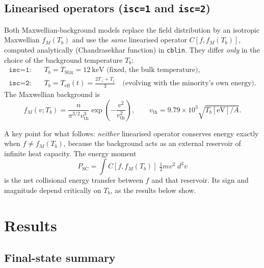 \documentclass[11pt,a4paper]{article}
\begin{document}
\subsection{Linearised operators (\texttt{isc=1} and \texttt{isc=2})}

Both Maxwellian-background models replace the field distribution by an
isotropic Maxwellian $f_M(T_b)$ and use the \emph{same} linearised operator
$C[f, f_M(T_b)]$, computed analytically (Chandrasekhar function) in
\texttt{cblin}. They differ \emph{only} in the choice of the background
temperature $T_b$:
\begin{align}
  \texttt{isc=1}:&\quad T_b = T_\text{Stix} = 12~\text{keV (fixed, the bulk
    temperature)},\\
  \texttt{isc=2}:&\quad T_b = T_\text{eff}(t) = \frac{2T_\perp + T_\parallel}{3}
    \quad\text{(evolving with the minority's own energy)}.
\end{align}
The Maxwellian background is
\begin{equation}
  f_M(v; T_b) = \frac{n}{\pi^{3/2} v_\text{th}^3}
    \exp\!\left(-\frac{v^2}{v_\text{th}^2}\right),
  \qquad
  v_\text{th} = 9.79\times10^3\sqrt{T_b[\text{eV}]/A}.
\end{equation}

A key point for what follows: \emph{neither} linearised operator conserves
energy exactly when $f \neq f_M(T_b)$, because the background acts as an
external reservoir of infinite heat capacity. The energy moment
\begin{equation}
  P_\text{SC} = \int C[f, f_M(T_b)]\;\tfrac{1}{2}mv^2\;d^3v
  \label{eq:psc}
\end{equation}
is the net collisional energy transfer between $f$ and that reservoir. Its
sign and magnitude depend critically on $T_b$, as the results below show.

\section{Results}

\subsection{Final-state summary}
\end{document}

